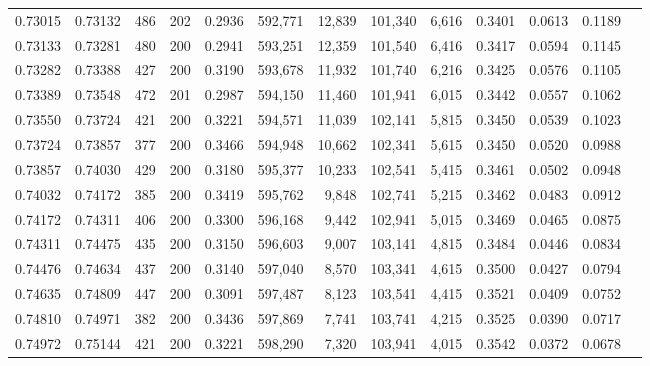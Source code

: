 \begin{tabular}{rrrrrrrrrrrrr}
0.73015 & 0.73132 &   486 & 202 &                                     0.2936 & 592,771 &  12,839 & 101,340 &   6,616 & 0.3401 & 0.0613 & 0.1189 \\
0.73133 & 0.73281 &   480 & 200 &                                     0.2941 & 593,251 &  12,359 & 101,540 &   6,416 & 0.3417 & 0.0594 & 0.1145 \\
0.73282 & 0.73388 &   427 & 200 &                                     0.3190 & 593,678 &  11,932 & 101,740 &   6,216 & 0.3425 & 0.0576 & 0.1105 \\
0.73389 & 0.73548 &   472 & 201 &                                     0.2987 & 594,150 &  11,460 & 101,941 &   6,015 & 0.3442 & 0.0557 & 0.1062 \\
0.73550 & 0.73724 &   421 & 200 &                                     0.3221 & 594,571 &  11,039 & 102,141 &   5,815 & 0.3450 & 0.0539 & 0.1023 \\
0.73724 & 0.73857 &   377 & 200 &                                     0.3466 & 594,948 &  10,662 & 102,341 &   5,615 & 0.3450 & 0.0520 & 0.0988 \\
0.73857 & 0.74030 &   429 & 200 &                                     0.3180 & 595,377 &  10,233 & 102,541 &   5,415 & 0.3461 & 0.0502 & 0.0948 \\
0.74032 & 0.74172 &   385 & 200 &                                     0.3419 & 595,762 &   9,848 & 102,741 &   5,215 & 0.3462 & 0.0483 & 0.0912 \\
0.74172 & 0.74311 &   406 & 200 &                                     0.3300 & 596,168 &   9,442 & 102,941 &   5,015 & 0.3469 & 0.0465 & 0.0875 \\
0.74311 & 0.74475 &   435 & 200 &                                     0.3150 & 596,603 &   9,007 & 103,141 &   4,815 & 0.3484 & 0.0446 & 0.0834 \\
0.74476 & 0.74634 &   437 & 200 &                                     0.3140 & 597,040 &   8,570 & 103,341 &   4,615 & 0.3500 & 0.0427 & 0.0794 \\
0.74635 & 0.74809 &   447 & 200 &                                     0.3091 & 597,487 &   8,123 & 103,541 &   4,415 & 0.3521 & 0.0409 & 0.0752 \\
0.74810 & 0.74971 &   382 & 200 &                                     0.3436 & 597,869 &   7,741 & 103,741 &   4,215 & 0.3525 & 0.0390 & 0.0717 \\
0.74972 & 0.75144 &   421 & 200 &                                     0.3221 & 598,290 &   7,320 & 103,941 &   4,015 & 0.3542 & 0.0372 & 0.0678 \\

\end{tabular}
